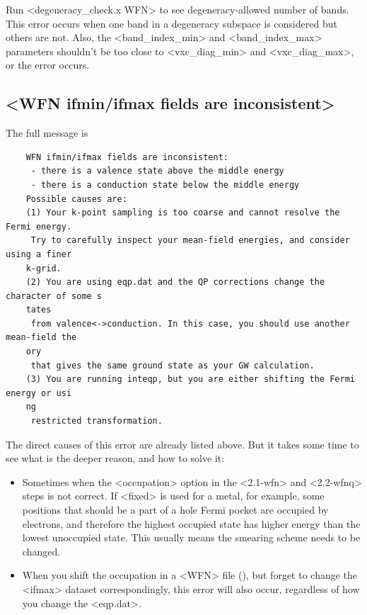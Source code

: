 \documentclass[hyperref, a4paper]{report}
\def\texttt#1{<#1>}%
\newcommand{\shortcode}[1]{\texttt{#1}}
\begin{document}
Run \shortcode{degeneracy_check.x WFN} to see degeneracy-allowed number of bands.
This error occurs when one band in a degeneracy subspace is considered 
but others are not.
Also, the \shortcode{band_index_min} and \shortcode{band_index_max} parameters
shouldn't be too close to \shortcode{vxc_diag_min} and \shortcode{vxc_diag_max}, 
or the error occurs.

\subsection{\shortcode{WFN ifmin/ifmax fields are inconsistent}}\label{sec:semimetal-error-1}

The full message is 
\begin{lstlisting}
    WFN ifmin/ifmax fields are inconsistent:
     - there is a valence state above the middle energy
     - there is a conduction state below the middle energy
    Possible causes are:
    (1) Your k-point sampling is too coarse and cannot resolve the Fermi energy.
     Try to carefully inspect your mean-field energies, and consider using a finer 
    k-grid.
    (2) You are using eqp.dat and the QP corrections change the character of some s
    tates
     from valence<->conduction. In this case, you should use another mean-field the
    ory
     that gives the same ground state as your GW calculation.
    (3) You are running inteqp, but you are either shifting the Fermi energy or usi
    ng 
     restricted transformation.   
\end{lstlisting}

The direct causes of this error are already listed above.
But it takes some time to see what is the deeper reason, 
and how to solve it:
\begin{itemize}
    \item Sometimes when the \shortcode{occupation} option 
    in the \shortcode{2.1-wfn} and \shortcode{2.2-wfnq} steps 
    is not correct.
    If \shortcode{fixed} is used for a metal, for example, 
    some positions that should be a part of a hole Fermi pocket 
    are occupied by electrons,
    and therefore the highest occupied state has higher energy than the lowest unoccupied state.
    This usually means the smearing scheme needs to be changed.
    \item When you shift the occupation in a \shortcode{WFN} file (), 
    but forget to change the \shortcode{ifmax} dataset correspondingly, 
    this error will also occur,
    regardless of how you change the \shortcode{eqp.dat}.
\end{itemize}
\end{document}
